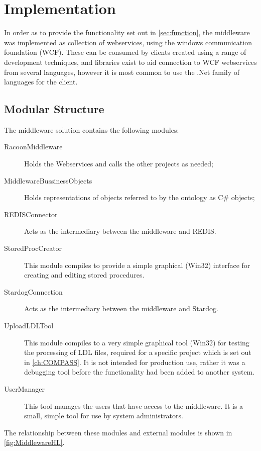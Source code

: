 \section{Implementation}
In order as to provide the functionality set out in \autoref{sec:function}, the middleware was implemented as collection of webservices, using the windows communication foundation (WCF). These can be consumed by clients created using a range of development techniques, and libraries exist to aid connection to WCF webservices from several languages, however it is most common to use the .Net family of languages for the client.

\subsection{Modular Structure}
The middleware solution contains the following modules:
\begin{description}
    \item[RacoonMiddleware] Holds the Webservices and calls the other projects as needed;
    \item[MiddlewareBussinessObjects] Holds representations of objects referred to by the ontology as C\# objects;     
    \item[REDISConnector] Acts as the intermediary between the middleware and REDIS.
    \item[StoredProcCreator]
    This module compiles to provide a simple graphical (Win32) interface for creating and editing stored procedures. 
    \item[StardogConnection]  Acts as the intermediary between the middleware and Stardog.    
    \item[UploadLDLTool]
    This module compiles to a very simple graphical tool (Win32) for testing the processing of LDL files, required for a specific project which is set out in  \autoref{ch:COMPASS}. It is not intended for production use, rather it was a debugging tool before the functionality had been added to another system.
    \item[UserManager]
    This tool manages the users that have access to the middleware. It is a small, simple tool for use by system administrators.
\end{description}

The relationship between these modules and external modules is shown in \autoref{fig:MiddlewareHL}.

